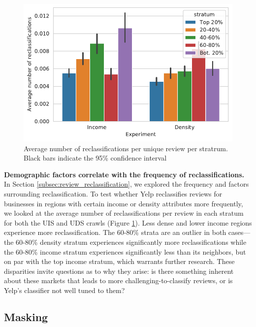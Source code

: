 \begin{figure}[t]
    \centering
    \includegraphics[width=0.9\columnwidth]{figures/stratified_reclass_swaps_usa.pdf}
    \caption{Average number of reclassifications per unique review per stratrum. Black bars indicate the 95\% confidence interval}
    \label{fig:stratified_reclass_swaps_usa}
\end{figure}

\textbf{Demographic factors correlate with the frequency of reclassifications.} In Section \ref{subsec:review_reclassification}, we explored the frequency and factors surrounding reclassification. To test whether Yelp reclassifies reviews for businesses in regions with certain income or density attributes more frequently, we looked at the average number of reclassifications per review in each stratum for both the UIS and UDS crawls (Figure \ref{fig:stratified_reclass_swaps_usa}). Less dense and lower income regions experience more reclassification. The 60-80\% strata are an outlier in both cases---the 60-80\% density stratum experiences significantly more reclassifications while the 60-80\% income stratum experiences significantly less than its neighbors, but on par with the top income stratum, which warrants further research. These disparities invite questions as to why they arise: is there something inherent about these markets that leads to more challenging-to-classify reviews, or is Yelp's classifier not well tuned to them?



\subsection{Masking}

